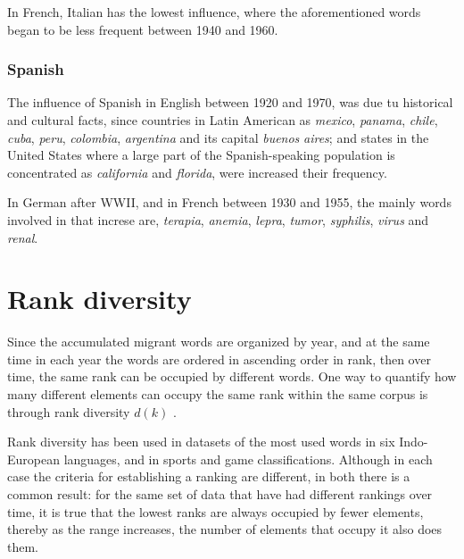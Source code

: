 \documentclass[10pt,letterpaper]{article} %
\begin{document}
In French, Italian has the lowest influence, where the aforementioned words began to be less frequent between 1940 and 1960.
\subsubsection*{Spanish} %

The influence of Spanish in English between 1920 and 1970, was due tu historical and cultural facts, since countries in Latin American as  \textit{mexico}, \textit{panama}, \textit{chile}, \textit{cuba}, \textit{peru}, \textit{colombia}, \textit{argentina} and its capital \textit{buenos} \textit{aires};  and states in the United States  where a large part of the Spanish-speaking population is concentrated as \textit{california} and \textit{florida}, were increased their frequency.

In German after WWII, and in French between 1930 and 1955, the mainly words involved in that increse are, \textit{terapia}, \textit{anemia}, \textit{lepra}, \textit{tumor}, \textit{syphilis}, \textit{virus} and \textit{renal}.

\section*{Rank diversity} %

Since the accumulated migrant words are organized by year, and at the same time
in each year the words are ordered in ascending order in rank, then over time,
the same rank can be occupied by different words. One way to quantify how many
different elements can occupy the same rank within the same corpus is through
rank diversity $d(k)$ .

Rank diversity has been used in datasets of the most used words in six
Indo-European languages, and in sports and game classifications. Although in
each case the criteria for establishing a ranking are different, in both there
is a common result: for the same set of data that have had different rankings
over time, it is true that the lowest ranks are always occupied by fewer
elements, thereby as the range increases, the number of elements that occupy it
also does them.
\end{document}
